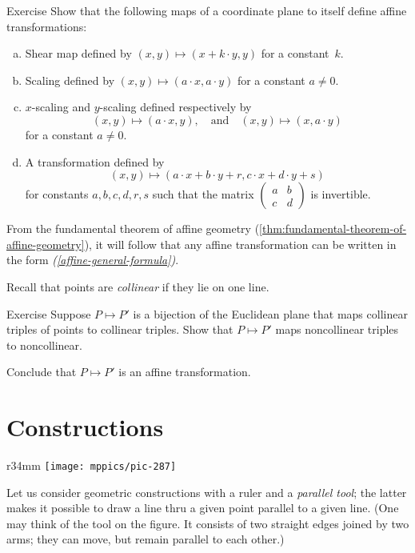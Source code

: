 \begin{thm}{Exercise}\label{ex:afine-linear}
Show that the following maps of a coordinate plane to itself define affine transformations:
\begin{enumerate}[(a)]
\item\label{ex:afine-linear:shear} Shear map defined by $(x,y)\mapsto (x+k\cdot y,y)$ for a constant~$k$.
\item\label{ex:afine-linear:scaling} Scaling defined by $(x,y)\mapsto (a\cdot x,a\cdot y)$ for a constant $a\ne 0$.
\item $x$-scaling and $y$-scaling defined respectively by 
\[(x,y)\mapsto (a\cdot x,y),\quad\text{and}\quad(x,y)\mapsto (x,a\cdot y)\]
for a constant $a\ne 0$.
\item\label{affine-general-formula} A transformation defined by
\[(x,y)\mapsto(a\cdot x+b\cdot y+r,c\cdot x+d\cdot y+s)\]
for constants $a,b,c,d,r,s$ such that the matrix $(\begin{smallmatrix}a&b\\c&d\end{smallmatrix})$ is invertible. 
\end{enumerate}
\end{thm}

From the fundamental theorem of affine geometry (\ref{thm:fundamental-theorem-of-affine-geometry}), it will follow that any affine transformation can be written in the form \textit{(\ref{affine-general-formula})}.

Recall that points are \emph{collinear} if they lie on one line.

\begin{thm}{Exercise}\label{ex:collinear=affine}
Suppose $P\mapsto P'$ is a bijection of the Euclidean plane that maps collinear triples of points to collinear triples.
Show that $P\mapsto P'$ maps noncollinear triples to noncollinear.

Conclude that $P\mapsto P'$ is an affine transformation.
\end{thm}


\section{Constructions}

\begin{wrapfigure}{r}{34mm}
\vskip-12mm
\centering
\texttt{[image: mppics/pic-287]}
\end{wrapfigure}

Let us consider geometric constructions with a ruler and a \emph{parallel tool};
the latter makes it possible to draw a line thru a given point parallel to a given line.
(One may think of the tool on the figure.
It consists of two straight edges joined by two arms;
they can move, but remain parallel to each other.)


